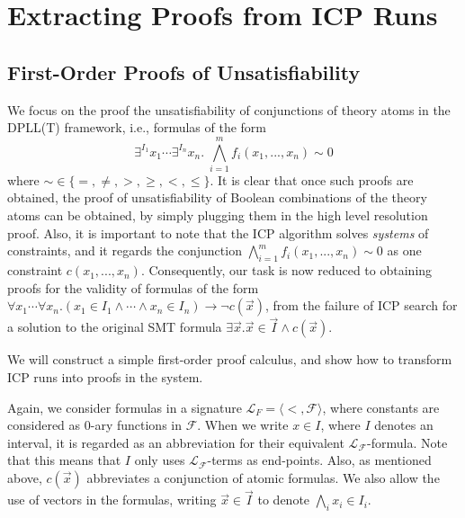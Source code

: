 \documentclass[12pt]{article}
\begin{document}
\section{Extracting Proofs from ICP Runs}\label{icp}

\subsection{First-Order Proofs of Unsatisfiability}

We focus on the proof the unsatisfiability of conjunctions of theory
atoms in the DPLL(T) framework, i.e., formulas of the form
$$\exists^{I_1} x_1\cdots \exists^{I_n} x_n.\; \bigwedge_{i=1}^m
f_i(x_1,...,x_n)\sim 0$$
where $\sim \in \{=,\neq, >, \geq, <, \leq\}$. It is clear that once such
proofs are obtained, the proof of unsatisfiability of Boolean combinations of
the theory atoms can be obtained, by simply plugging them in the high level
resolution proof. Also, it is important to note that the ICP algorithm solves
{\em systems} of constraints, and it regards the conjunction $\bigwedge_{i=1}^m
f_i(x_1,...,x_n)\sim 0$ as one constraint $c(x_1,...,x_n)$. Consequently, our
task is now reduced to obtaining proofs for the validity of formulas of the form
$\forall x_1 \cdots \forall x_n.(x_1\in I_1\wedge \cdots \wedge x_n\in I_n
)\rightarrow \neg c(\vec x)$, from the failure of ICP
search for a solution to the original SMT formula $\exists \vec x. \vec x\in
\vec I\wedge c(\vec x)$.

We will construct a simple first-order proof calculus, and show how to
transform ICP runs into proofs in the system.

Again, we consider formulas in a signature $\mathcal{L}_F = \langle <,
\mathcal{F} \rangle$, where constants are considered as 0-ary functions in
$\mathcal{F}$. When we write $x\in I$, where $I$ denotes an
interval, it is regarded as an abbreviation for their
equivalent $\mathcal{L}_\mathcal{F}$-formula. Note that this means that $I$ only
uses $\mathcal{L}_{\mathcal{F}}$-terms as end-points. Also, as mentioned above,
$c(\vec x)$ abbreviates a conjunction of atomic formulas. We also allow the use
of vectors in the formulas, writing $\vec x\in \vec I$ to denote $\bigwedge_i
x_i\in I_i$.
\end{document}
